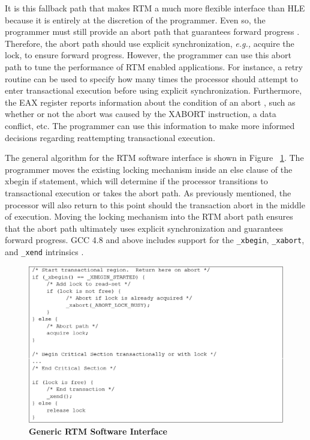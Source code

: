 \documentclass[11pt]{book}
\begin{document}
It is this fallback path that makes RTM a much more flexible interface than HLE because it
is entirely at the discretion of the programmer.  Even so, the programmer must still
provide an abort path that guarantees forward progress \cite{intel_prog_ref}.  Therefore,
the abort path should use explicit synchronization, \emph{e.g.,} acquire the lock, to
ensure forward progress. However, the programmer can use this abort path to tune the
performance of RTM enabled applications.  For instance, a retry routine can be used to
specify how many times the processor should attempt to enter transactional execution
before using explicit synchronization.  Furthermore, the EAX register reports information
about the condition of an abort \cite{intel_prog_ref}, such as whether or not the abort
was caused by the XABORT instruction, a data conflict, etc.  The programmer can use this
information to make more informed decisions regarding reattempting transactional
execution.

The general algorithm for the RTM software interface is shown in Figure
~\ref{fig:rtm_interface}.  The programmer moves the existing locking mechanism inside an
else clause of the xbegin if statement, which will determine if the processor transitions
to transactional execution or takes the abort path.  As previously mentioned, the
processor will also return to this point should the transaction abort in the middle of
execution. Moving the locking mechanism into the RTM abort path ensures that the abort
path ultimately uses explicit synchronization and guarantees forward progress.  GCC 4.8
and above includes support for the \texttt{\_xbegin}, \texttt{\_xabort}, and
\texttt{\_xend} intrinsics \cite{gcc}.

\begin{figure}[H]
    \centering
    \graphicspath{ {./figures/} }
    \includegraphics[width=\textwidth,height=\textheight,keepaspectratio]{fig_rtmInterface}
    \caption{\textbf{Generic RTM Software Interface}}
    \label{fig:rtm_interface}
\end{figure}
\end{document}
